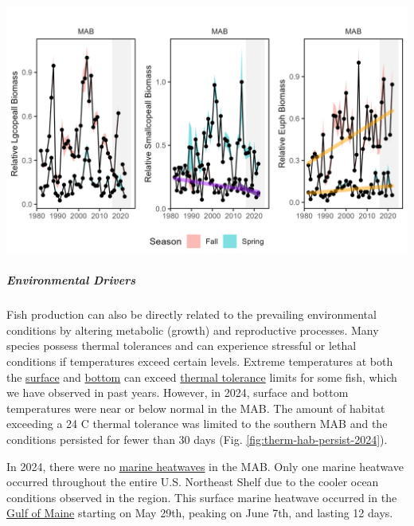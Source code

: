 \documentclass[
  10pt,
]{article}
\let\origfigure\figure
\let\endorigfigure\endfigure
\renewenvironment{figure}[1][2] {
    \expandafter\origfigure\expandafter[H]
} {
    \endorigfigure
}
\begin{document}
\begin{figure}

{\centering \includegraphics[width=6.5in]{images/MidAtlantic/zooplankton_anomaly_MidAtlantic_2025-09-05} 

}

\caption{Changes in zooplankton abundance in the MAB for large (left) and small (center) copepods, and Euphausiids (right), with significant decreases (purple) in small copepods and increases (orange) in Euphausiids.}\label{fig:zoopanom}
\end{figure}

\subparagraph{Environmental Drivers}\label{environmental-drivers}

Fish production can also be directly related to the prevailing environmental conditions by altering metabolic (growth) and reproductive processes. Many species possess thermal tolerances and can experience stressful or lethal conditions if temperatures exceed certain levels. Extreme temperatures at both the \href{https://noaa-edab.github.io/catalog/seasonal_oisst_anom.html}{surface} and \href{https://noaa-edab.github.io/catalog/bottom_temp_model_anom.html}{bottom} can exceed \href{https://noaa-edab.github.io/catalog/thermal_habitat_gridded.html}{thermal tolerance} limits for some fish, which we have observed in past years. However, in 2024, surface and bottom temperatures were near or below normal in the MAB. The amount of habitat exceeding a 24 C thermal tolerance was limited to the southern MAB and the conditions persisted for fewer than 30 days (Fig. \ref{fig:therm-hab-persist-2024}).

In 2024, there were no \href{https://noaa-edab.github.io/catalog/heatwave.html}{marine heatwaves} in the MAB. Only one marine heatwave occurred throughout the entire U.S. Northeast Shelf due to the cooler ocean conditions observed in the region. This surface marine heatwave occurred in the \href{https://noaa-edab.github.io/catalog/heatwave_year.html\#newengland-22}{Gulf of Maine} starting on May 29th, peaking on June 7th, and lasting 12 days.
\end{document}
